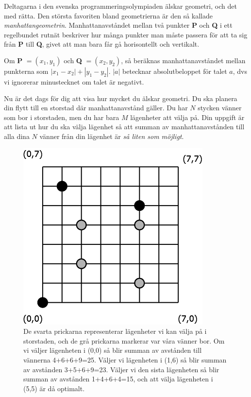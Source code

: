 
Deltagarna i den svenska programmeringsolympiaden älskar geometri, och det med rätta. Den största favoriten bland geometrierna är den så kallade \emph{manhattangeometrin}. Manhattanavståndet mellan två punkter \textbf{P} och \textbf{Q} i ett regelbundet rutnät beskriver hur många punkter man måste passera för att ta sig från \textbf{P} till \textbf{Q}, givet att man bara får gå horisontellt och vertikalt.

Om \textbf{P} $= (x_1,y_1)$ och \textbf{Q} $= (x_2,y_2)$, så beräknas manhattanavståndet mellan punkterna som $|x_1-x_2| + |y_1-y_2|$. $|a|$ betecknar absolutbeloppet för talet $a$, dvs vi ignorerar minustecknet om talet är negativt.

Nu är det dags för dig att visa hur mycket du älskar geometri. Du ska planera din flytt till en storstad där manhattanavstånd gäller. Du har $N$ stycken vänner som bor i storstaden, men du har bara $M$ lägenheter att välja på. Din uppgift är att lista ut hur du ska välja lägenhet så att summan av manhattanavstånden till alla dina $N$ vänner från din lägenhet är \emph{så liten som möjligt}.

\begin{figure}[!h]
	\begin{center}
	\includegraphics[scale=0.4]{Storstad}
	\end{center}
	\caption{De svarta prickarna representerar lägenheter vi kan välja på i storstaden, och de grå prickarna markerar var våra vänner bor. Om vi väljer lägenheten i (0,0) så blir summan av avstånden till vännerna 4+6+6+9=25. Väljer vi lägenheten i (1,6) så blir summan av avstånden 3+5+6+9=23. Väljer vi den sista lägenheten så blir summan av avstånden 1+4+6+4=15, och att välja lägenheten i (5,5) är då optimalt.}
	\label{fig1}
	\end{figure}

